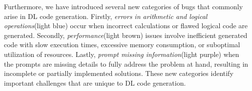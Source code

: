 Furthermore, we have introduced several new categories of bugs that commonly arise in DL code generation. Firstly, \textit{errors in arithmetic and logical operations}(light blue) occur when incorrect calculations or flawed logical code are generated.
Secondly, \textit{performance}(light brown) issues involve inefficient generated code with slow execution times, excessive memory consumption, or suboptimal utilization of resources.
Lastly, \textit{prompt missing information}(light purple) when the prompts are missing details to fully address the problem at hand, resulting in incomplete or partially implemented solutions.
These new categories identify important challenges that are unique to DL code generation.



